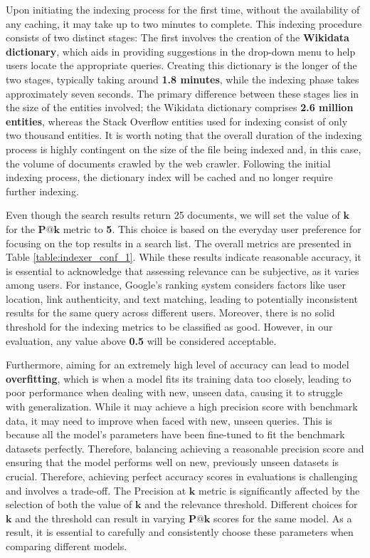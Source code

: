 {Upon initiating the indexing process for the first time, without the availability of any caching, it may take up to two minutes to complete. This indexing procedure consists of two distinct stages: The first involves the creation of the \textbf{Wikidata dictionary}, which aids in providing suggestions in the drop-down menu to help users locate the appropriate queries. Creating this dictionary is the longer of the two stages, typically taking around \textbf{1.8 minutes}, while the indexing phase takes approximately seven seconds. The primary difference between these stages lies in the size of the entities involved; the Wikidata dictionary comprises \textbf{2.6 million entities}, whereas the Stack Overflow entities used for indexing consist of only two thousand entities. It is worth noting that the overall duration of the indexing process is highly contingent on the size of the file being indexed and, in this case, the volume of documents crawled by the web crawler. Following the initial indexing process, the dictionary index will be cached and no longer require further indexing.

Even though the search results return 25 documents, we will set the value of $\bm{k}$ for the $\bm{P@k}$ metric to \textbf{5}. This choice is based on the everyday user preference for focusing on the top results in a search list. The overall metrics are presented in Table \ref{table:indexer_conf_1}. While these results indicate reasonable accuracy, it is essential to acknowledge that assessing relevance can be subjective, as it varies among users. For instance, Google's ranking system considers factors like user location, link authenticity, and text matching, leading to potentially inconsistent results for the same query across different users. Moreover, there is no solid threshold for the indexing metrics to be classified as good. However, in our evaluation, any value above \textbf{0.5} will be considered acceptable. 

Furthermore, aiming for an extremely high level of accuracy can lead to model \textbf{overfitting}, which is when a model fits its training data too closely, leading to poor performance when dealing with new, unseen data, causing it to struggle with generalization. While it may achieve a high precision score with benchmark data, it may need to improve when faced with new, unseen queries. This is because all the model's parameters have been fine-tuned to fit the benchmark datasets perfectly. Therefore, balancing achieving a reasonable precision score and ensuring that the model performs well on new, previously unseen datasets is crucial. Therefore, achieving perfect accuracy scores in evaluations is challenging and involves a trade-off. The Precision at $\bm{k}$ metric is significantly affected by the selection of both the value of $\bm{k}$ and the relevance threshold. Different choices for $\bm{k}$ and the threshold can result in varying $\bm{P@k}$ scores for the same model. As a result, it is essential to carefully and consistently choose these parameters when comparing different models.

}

